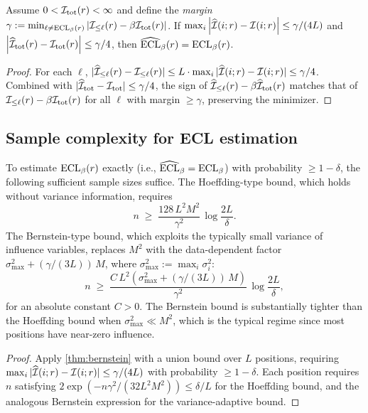 \begin{theorem}\label{thm:ecl_stability}
Assume $0<\mathcal{I}_{\mathrm{tot}}(r)<\infty$ and define the \emph{margin}
$\gamma := \min_{\ell\neq \mathrm{ECL}_\beta(r)} \left\lvert \mathcal{I}_{\le \ell}(r)-\beta \mathcal{I}_{\mathrm{tot}}(r) \right\rvert$.
If $\max_i \left\lvert \widehat{\mathcal{I}}(i;r)-\mathcal{I}(i;r) \right\rvert \le \gamma/(4L)$ and $\left\lvert \widehat{\mathcal{I}}_{\mathrm{tot}}(r)-\mathcal{I}_{\mathrm{tot}}(r) \right\rvert\le \gamma/4$, then $\widehat{\mathrm{ECL}}_\beta(r)=\mathrm{ECL}_\beta(r)$.
\end{theorem}
\begin{proof}
For each $\ell$, $|\widehat{\mathcal{I}}_{\le \ell}(r)-\mathcal{I}_{\le \ell}(r)| \le L \cdot \max_i |\widehat{\mathcal{I}}(i;r)-\mathcal{I}(i;r)| \le \gamma/4$. Combined with $|\widehat{\mathcal{I}}_{\mathrm{tot}} - \mathcal{I}_{\mathrm{tot}}| \le \gamma/4$, the sign of $\widehat{\mathcal{I}}_{\le \ell}(r) - \beta\widehat{\mathcal{I}}_{\mathrm{tot}}(r)$ matches that of $\mathcal{I}_{\le \ell}(r) - \beta\mathcal{I}_{\mathrm{tot}}(r)$ for all $\ell$ with margin $\ge \gamma$, preserving the minimizer.
\end{proof}

\subsection{Sample complexity for ECL estimation}

\begin{corollary}\label{cor:sample_complexity}
To estimate $\mathrm{ECL}_\beta(r)$ exactly (i.e., $\widehat{\mathrm{ECL}}_\beta = \mathrm{ECL}_\beta$) with probability $\ge 1-\delta$, the following sufficient sample sizes suffice. The Hoeffding-type bound, which holds without variance information, requires
\begin{equation}\label{eq:sample_complexity}
n \;\ge\; \frac{128\, L^2 M^2}{\gamma^2}\,\log\!\frac{2L}{\delta}.
\end{equation}
The Bernstein-type bound, which exploits the typically small variance of influence variables, replaces $M^2$ with the data-dependent factor $\sigma_{\max}^2 + (\gamma/(3L))\,M$, where $\sigma_{\max}^2 := \max_i \sigma_i^2$:
\begin{equation}\label{eq:sample_complexity_bern}
n \;\ge\; \frac{C\, L^2 (\sigma_{\max}^2 + (\gamma/(3L))\,M)}{\gamma^2}\,\log\!\frac{2L}{\delta},
\end{equation}
for an absolute constant $C > 0$. The Bernstein bound is substantially tighter than the Hoeffding bound when $\sigma_{\max}^2 \ll M^2$, which is the typical regime since most positions have near-zero influence.
\end{corollary}
\begin{proof}
Apply \cref{thm:bernstein} with a union bound over $L$ positions, requiring $\max_i |\widehat{\mathcal{I}}(i;r) - \mathcal{I}(i;r)| \le \gamma/(4L)$ with probability $\ge 1-\delta$. Each position requires $n$ satisfying $2\exp(-n\gamma^2/(32L^2 M^2)) \le \delta/L$ for the Hoeffding bound, and the analogous Bernstein expression for the variance-adaptive bound.
\end{proof}

